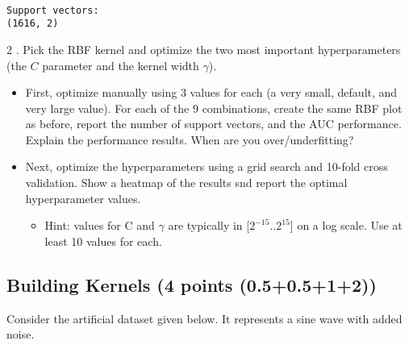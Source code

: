\documentclass[11pt]{article}
\providecommand{\tightlist}{%
      \setlength{\itemsep}{0pt}\setlength{\parskip}{0pt}}
\begin{document}
    \begin{center}
    \end{center}
    { \hspace*{\fill} \\}
    
    \begin{Verbatim}[commandchars=\\\{\}]
Support vectors:
(1616, 2)

    \end{Verbatim}

    2 . Pick the RBF kernel and optimize the two most important
hyperparameters (the \(C\) parameter and the kernel width \(\gamma\)).

\begin{itemize}
\tightlist
\item
  First, optimize manually using 3 values for each (a very small,
  default, and very large value). For each of the 9 combinations, create
  the same RBF plot as before, report the number of support vectors, and
  the AUC performance. Explain the performance results. When are you
  over/underfitting?
\item
  Next, optimize the hyperparameters using a grid search and 10-fold
  cross validation. Show a heatmap of the results snd report the optimal
  hyperparameter values.

  \begin{itemize}
  \tightlist
  \item
    Hint: values for C and \(\gamma\) are typically in
    {[}\(2^{-15}..2^{15}\){]} on a log scale. Use at least 10 values for
    each.
  \end{itemize}
\end{itemize}

    \subsection{Building Kernels (4 points
(0.5+0.5+1+2))}\label{building-kernels-4-points-0.50.512}

Consider the artificial dataset given below. It represents a sine wave
with added noise.
\end{document}
